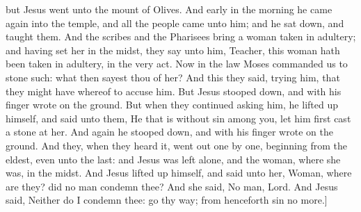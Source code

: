 but Jesus went unto the mount of Olives. And early in the morning he came again into the temple, and all the people came unto him; and he sat down, and taught them. And the scribes and the Pharisees bring a woman taken in adultery; and having set her in the midst, they say unto him, Teacher, this woman hath been taken in adultery, in the very act. Now in the law Moses commanded us to stone such: what then sayest thou of her? And this they said, trying him, that they might have whereof to accuse him. But Jesus stooped down, and with his finger wrote on the ground. But when they continued asking him, he lifted up himself, and said unto them, He that is without sin among you, let him first cast a stone at her. And again he stooped down, and with his finger wrote on the ground. And they, when they heard it, went out one by one, beginning from the eldest, even unto the last: and Jesus was left alone, and the woman, where she was, in the midst. And Jesus lifted up himself, and said unto her, Woman, where are they? did no man condemn thee? And she said, No man, Lord. And Jesus said, Neither do I condemn thee: go thy way; from henceforth sin no more.]  


